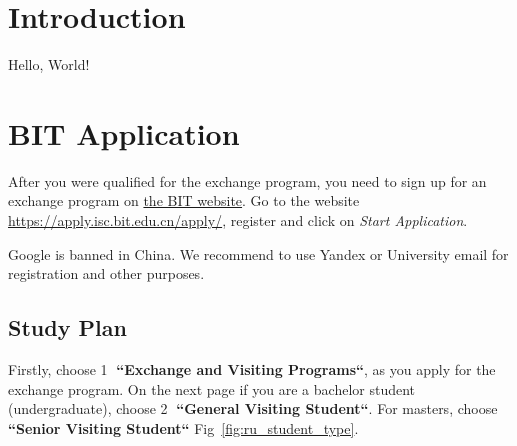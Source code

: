 

\chapter{Introduction}\label{ch:ru_introduction}
Hello, World!


\chapter{BIT Application}\label{ch:ru_application}

After you were qualified for the exchange program,
you need to sign up for an exchange program on
\href{https://apply.isc.bit.edu.cn/apply/}{the BIT website}.
Go to the website \url{https://apply.isc.bit.edu.cn/apply/},
register and click on \textit{Start Application}.

\begin{tcolorbox}[colback=yellow!10, colframe=yellow!80!black, title=Note]
    Google is banned in China.
    We recommend to use Yandex or University email
    for registration and other purposes.
\end{tcolorbox}


\section{Study Plan}\label{sec:study_plan}

Firstly, choose \textcircled{1} \textbf{``Exchange and Visiting Programs``},
as you apply for the exchange program.
On the next page if you are a bachelor student (undergraduate),
choose \textcircled{2} \textbf{``General Visiting Student``}.
For masters, choose \textbf{``Senior Visiting Student``}
Fig~\ref{fig:ru_student_type}.


